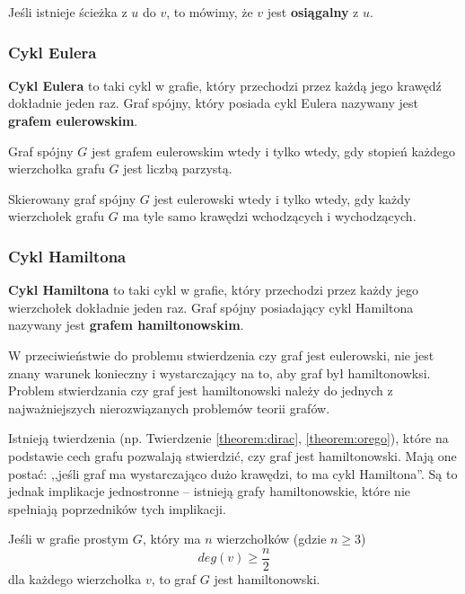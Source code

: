 Jeśli istnieje ścieżka z $u$ do $v$, to mówimy, że $v$ jest \textbf{osiągalny} z $u$.

\subsubsection*{Cykl Eulera}

\textbf{Cykl Eulera} to taki cykl w grafie, który przechodzi przez każdą jego krawędź dokładnie jeden raz. Graf spójny, który posiada cykl Eulera nazywany jest \textbf{grafem eulerowskim}. 

\begin{theorem}[Euler, 1736]
Graf spójny $G$ jest grafem eulerowskim wtedy i tylko wtedy, gdy stopień każdego wierzchołka grafu $G$ jest liczbą parzystą.
\end{theorem}

\begin{theorem}
Skierowany graf spójny $G$ jest eulerowski wtedy i tylko wtedy, gdy każdy wierzchołek grafu $G$ ma tyle samo krawędzi wchodzących i wychodzących.
\end{theorem}
	
\subsubsection*{Cykl Hamiltona}

\textbf{Cykl Hamiltona} to taki cykl w grafie, który przechodzi przez każdy jego wierzchołek dokładnie jeden raz. Graf spójny posiadający cykl Hamiltona nazywany jest \textbf{grafem hamiltonowskim}.

W przeciwieństwie do problemu stwierdzenia czy graf jest eulerowski, nie jest znany warunek konieczny i wystarczający na to, aby graf był hamiltonowksi. Problem stwierdzania czy graf jest hamiltonowski należy do jednych z najważniejszych nierozwiązanych problemów teorii grafów\cite[54]{wilson}. 

Istnieją twierdzenia (np. Twierdzenie \ref{theorem:dirac}, \ref{theorem:orego}), które na podstawie cech grafu pozwalają stwierdzić, czy graf jest hamiltonowski. Mają one postać: ,,jeśli graf ma wystarczająco dużo krawędzi, to ma cykl Hamiltona''\cite[54]{wilson}. Są to jednak implikacje jednostronne -- istnieją grafy hamiltonowskie, które nie spełniają poprzedników tych implikacji. 

\begin{theorem}[Dirac, 1952]\label{theorem:dirac}
Jeśli w grafie prostym $G$, który ma $n$ wierzchołków (gdzie $n \geq 3$)
\[deg(v) \geq \frac{n}{2}\] 
dla każdego wierzchołka $v$, to graf $G$ jest hamiltonowski.
\end{theorem}

